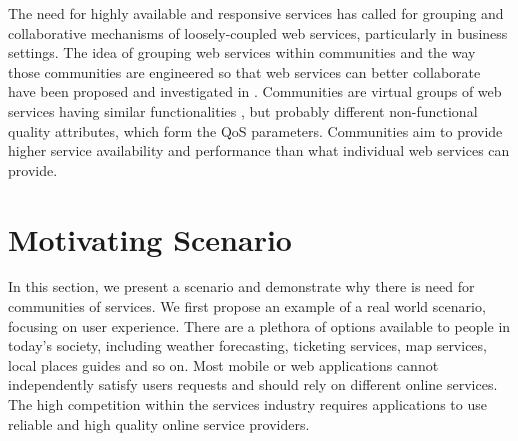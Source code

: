 The need for highly available and responsive services has called
for grouping and collaborative mechanisms of loosely-coupled web
services, particularly in business settings. The idea of grouping
web services within communities and the way those communities are
engineered so that web services can better collaborate have been
proposed and investigated in
\cite{DBLP:journals/ijebr/MaamarSTBB09,DBLP:journals/internet/BenatallahSD03,Rosario:2008:PQS:1512146.1512290}.
Communities are virtual groups of web services having similar
functionalities \cite{Zeng:2003:QDW:775152.775211,
Paik:2005:TSS:2229263.2230038,Medjahed05adynamic,10.1109/ARES.2008.7},
but probably different non-functional quality attributes, which
form the QoS parameters.
Communities aim to provide higher service
availability and performance than what individual web services can
provide.

\section{Motivating Scenario}\label{sec:motexample}

In this section, we present a scenario and demonstrate why there
is need for communities of services. We first propose an example
of a real world scenario, focusing on user experience. There are a
plethora of options available to people in today's society,
including weather forecasting, ticketing services, map services,
local places guides and so on. Most mobile or web applications
cannot independently satisfy users requests and should rely on
different online services. The high competition within the
services industry requires applications to use reliable and high
quality online service providers.


